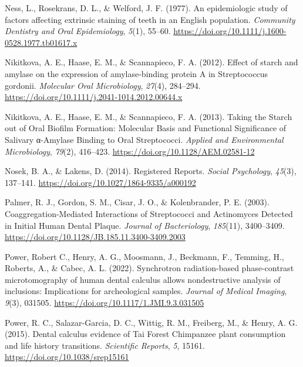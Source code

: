\documentclass[
  letterpaper,
]{book}
\newlength{\cslhangindent}
\newlength{\cslentryspacingunit} %
\newenvironment{CSLReferences}[2] %
 {%
  \setlength{\parindent}{0pt}
  \ifodd #1
  \let\oldpar\par
  \def\par{\hangindent=\cslhangindent\oldpar}
  \fi
  \setlength{\parskip}{#2\cslentryspacingunit}
 }%
 {}
\begin{document}
\begin{CSLReferences}{1}{0}
\leavevmode{}%
Ness, L., Rosekrans, D. L., \& Welford, J. F. (1977). An epidemiologic
study of factors affecting extrinsic staining of teeth in an {English}
population. \emph{Community Dentistry and Oral Epidemiology},
\emph{5}(1), 55--60.
\url{https://doi.org/10.1111/j.1600-0528.1977.tb01617.x}

\leavevmode{}%
Nikitkova, A. E., Haase, E. M., \& Scannapieco, F. A. (2012). Effect of
starch and amylase on the expression of amylase-binding protein {A} in
{Streptococcus} gordonii. \emph{Molecular Oral Microbiology},
\emph{27}(4), 284--294.
\url{https://doi.org/10.1111/j.2041-1014.2012.00644.x}

\leavevmode{}%
Nikitkova, A. E., Haase, E. M., \& Scannapieco, F. A. (2013). Taking the
{Starch} out of {Oral Biofilm Formation}: {Molecular Basis} and
{Functional Significance} of {Salivary} α-{Amylase Binding} to {Oral
Streptococci}. \emph{Applied and Environmental Microbiology},
\emph{79}(2), 416--423. \url{https://doi.org/10.1128/AEM.02581-12}

\leavevmode{}%
Nosek, B. A., \& Lakens, D. (2014). Registered {Reports}. \emph{Social
Psychology}, \emph{45}(3), 137--141.
\url{https://doi.org/10.1027/1864-9335/a000192}

\leavevmode{}%
Palmer, R. J., Gordon, S. M., Cisar, J. O., \& Kolenbrander, P. E.
(2003). Coaggregation-{Mediated Interactions} of {Streptococci} and
{Actinomyces Detected} in {Initial Human Dental Plaque}. \emph{Journal
of Bacteriology}, \emph{185}(11), 3400--3409.
\url{https://doi.org/10.1128/JB.185.11.3400-3409.2003}

\leavevmode{}%
Power, Robert C., Henry, A. G., Moosmann, J., Beckmann, F., Temming, H.,
Roberts, A., \& Cabec, A. L. (2022). Synchrotron radiation-based
phase-contrast microtomography of human dental calculus allows
nondestructive analysis of inclusions: Implications for archeological
samples. \emph{Journal of Medical Imaging}, \emph{9}(3), 031505.
\url{https://doi.org/10.1117/1.JMI.9.3.031505}

\leavevmode{}%
Power, R. C., Salazar-Garcia, D. C., Wittig, R. M., Freiberg, M., \&
Henry, A. G. (2015). Dental calculus evidence of {Tai Forest Chimpanzee}
plant consumption and life history transitions. \emph{Scientific
Reports}, \emph{5}, 15161. \url{https://doi.org/10.1038/srep15161}


\end{CSLReferences}
\end{document}
